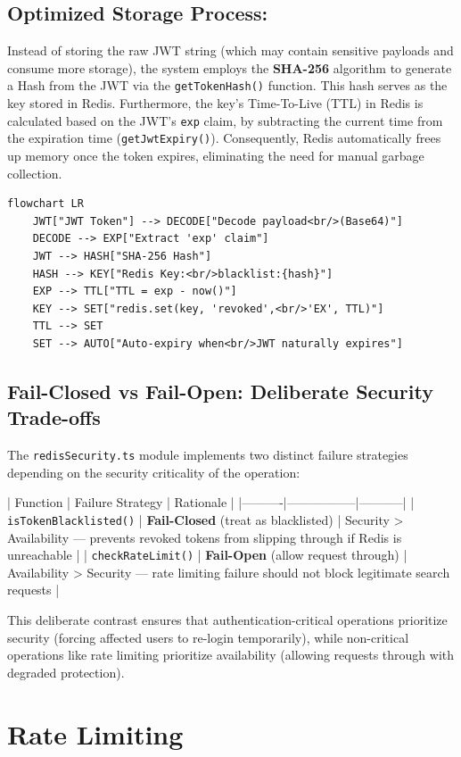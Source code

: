 \subsection{Optimized Storage Process:}
Instead of storing the raw JWT string (which may contain sensitive payloads and consume more storage), the system employs the \textbf{SHA-256} algorithm to generate a Hash from the JWT via the \texttt{getTokenHash()} function. This hash serves as the key stored in Redis.
Furthermore, the key's Time-To-Live (TTL) in Redis is calculated based on the JWT's \texttt{exp} claim, by subtracting the current time from the expiration time (\texttt{getJwtExpiry()}). Consequently, Redis automatically frees up memory once the token expires, eliminating the need for manual garbage collection.

\begin{verbatim}
flowchart LR
    JWT["JWT Token"] --> DECODE["Decode payload<br/>(Base64)"]
    DECODE --> EXP["Extract 'exp' claim"]
    JWT --> HASH["SHA-256 Hash"]
    HASH --> KEY["Redis Key:<br/>blacklist:{hash}"]
    EXP --> TTL["TTL = exp - now()"]
    KEY --> SET["redis.set(key, 'revoked',<br/>'EX', TTL)"]
    TTL --> SET
    SET --> AUTO["Auto-expiry when<br/>JWT naturally expires"]
\end{verbatim}

\subsection{Fail-Closed vs Fail-Open: Deliberate Security Trade-offs}

The \texttt{redisSecurity.ts} module implements two distinct failure strategies depending on the security criticality of the operation:

| Function | Failure Strategy | Rationale |
|----------|-----------------|-----------|
| \texttt{isTokenBlacklisted()} | \textbf{Fail-Closed} (treat as blacklisted) | Security > Availability — prevents revoked tokens from slipping through if Redis is unreachable |
| \texttt{checkRateLimit()} | \textbf{Fail-Open} (allow request through) | Availability > Security — rate limiting failure should not block legitimate search requests |

This deliberate contrast ensures that authentication-critical operations prioritize security (forcing affected users to re-login temporarily), while non-critical operations like rate limiting prioritize availability (allowing requests through with degraded protection).

\section{Rate Limiting}

